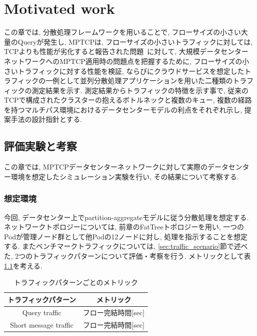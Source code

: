 \chapter{Motivated work}
\label{chapter:motivated_work}
この章では, 分散処理フレームワークを用いることで, フローサイズの小さい大量のQueryが発生し, MPTCPは,
フローサイズの小さいトラフィックに対しては, TCPよりも性能が劣化すると報告された問題~\cite{improving}に対して, 大規模データセンターネットワークへのMPTCP適用時の問題点を把握するために,
フローサイズの小さいトラフィックに対する性能を検証, ならびにクラウドサービスを想定したトラフィックの一例として並列分散処理アプリケーションを用いた二種類のトラフィックの測定結果を示す.
測定結果からトラフィックの特徴を示す事で, 従来のTCPで構成されたクラスターの抱えるボトルネックと複数のキュー,
複数の経路を持つマルチパス環境におけるデータセンターモデルの利点をそれぞれ示し, 提案手法の設計指針とする.

\section{評価実験と考察}
\label{sec:evaluation}
この章では, MPTCPデータセンターネットワークに対して実際のデータセンター環境を想定したシミュレーション実験を行い, その結果について考察する.

\subsection{想定環境}
今回, データセンター上でpartition-aggregateモデルに従う分散処理を想定する.
ネットワークトポロジーについては, 前章のFatTreeトポロジーを用い, 一つのPodが管理ノード群として他Podの12ノードに対し,
処理を指示することを想定する.
またベンチマークトラフィックについては, \ref{sec:traffic_scenario}節で述べた, 2つのトラフィックパターンについて評価・考察を行う.
メトリックとして表\ref{metric}を考える.
\begin{table}[t]
\begin{center}
\begin{tabular}{c|c}
\hline
トラフィックパターン & メトリック \\ \hline \hline
Query traffic & フロー完結時間[sec] \\
Short message traffic & フロー完結時間[sec] \\
\hline
\end{tabular}
\caption{トラフィックパターンごとのメトリック}
\label{metric}
\end{center}
\end{table}

